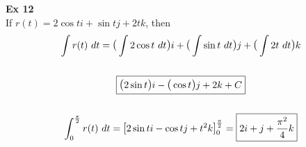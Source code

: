 \documentclass{article}
\begin{document}
  \textbf{Ex 12}\\
  If $ r(t) =2\cos{t}i+\sin{t}j+2tk$, then
  \[
      \begin{gathered}
      \int r(t)~dt= \text{\large{(}} \int 2\cos{t}~dt \text{\large{)}}i+ \text{\large{(}} \int \sin{t}~dt \text{\large{)}}j + \text{\large{(}} \int 2t~dt \text{\large{)}}k\\
      ~\\
      \boxed{\text{\large{(}} 2\sin{t} \text{\large{)}}i - \text{\large{(}} \cos{t} \text{\large{)}}j + 2k + C}\\
      ~\\
      \int^{\frac{\pi}{2}}_{0} r(t)~dt= \text{\large{[}} 2\sin{t}i - \cos{t}j + t^{2}k \text{\large{]}}^{\frac{\pi}{2}}_{0}= \boxed{2i+j+\frac{\pi^{2}}{4}k} 
      \end{gathered}
  \]
  
\end{document}

